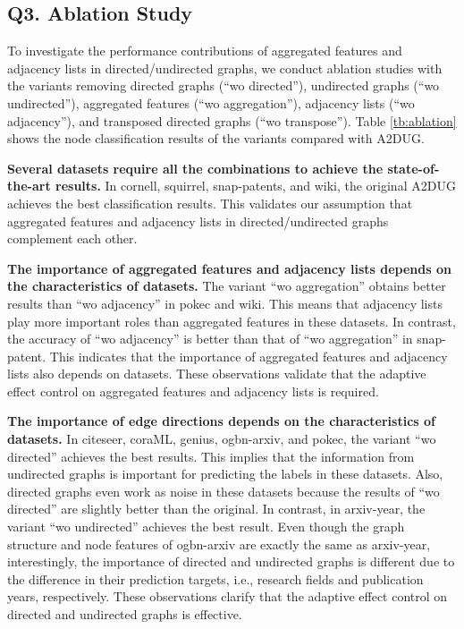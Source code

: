 \subsection{Q3. Ablation Study}
\label{ssec:ablation}
To investigate the performance contributions of aggregated features and adjacency lists in directed/undirected graphs, we conduct ablation studies with the variants removing directed graphs (``wo directed''), undirected graphs (``wo undirected''), aggregated features (``wo aggregation''), adjacency lists (``wo adjacency''), and transposed directed graphs (``wo transpose''). 
Table \ref{tb:ablation} shows the node classification results of the variants compared with \textsc{A2DUG}. 

\smallskip \noindent \textbf{Several datasets require all the combinations to achieve the state-of-the-art results. }
In cornell, squirrel, snap-patents, and wiki, the original \textsc{A2DUG} achieves the best classification results. 
This validates our assumption that aggregated features and adjacency lists in directed/undirected graphs complement each other. 


\smallskip \noindent \textbf{The importance of aggregated features and adjacency lists depends on the characteristics of datasets. }
The variant ``wo aggregation'' obtains better results than ``wo adjacency'' in pokec and wiki. 
This means that adjacency lists play more important roles than aggregated features in these datasets. 
In contrast, the accuracy of ``wo adjacency'' is better than that of ``wo aggregation'' in snap-patent. 
This indicates that the importance of aggregated features and adjacency lists also depends on datasets. 
These observations validate that the adaptive effect control on aggregated features and adjacency lists is required. 

\smallskip \noindent \textbf{The importance of edge directions depends on the characteristics of datasets. }
In citeseer, coraML, genius, ogbn-arxiv, and pokec, the variant ``wo directed'' achieves the best results.
This implies that the information from undirected graphs is important for predicting the labels in these datasets. 
Also, directed graphs even work as noise in these datasets because the results of ``wo directed'' are slightly better than the original.
In contrast, in arxiv-year, the variant ``wo undirected'' achieves the best result. 
Even though the graph structure and node features of ogbn-arxiv are exactly the same as arxiv-year, interestingly, the importance of directed and undirected graphs is different due to the difference in their prediction targets, i.e., research fields and publication years, respectively. 
These observations clarify that the adaptive effect control on directed and undirected graphs is effective. 


